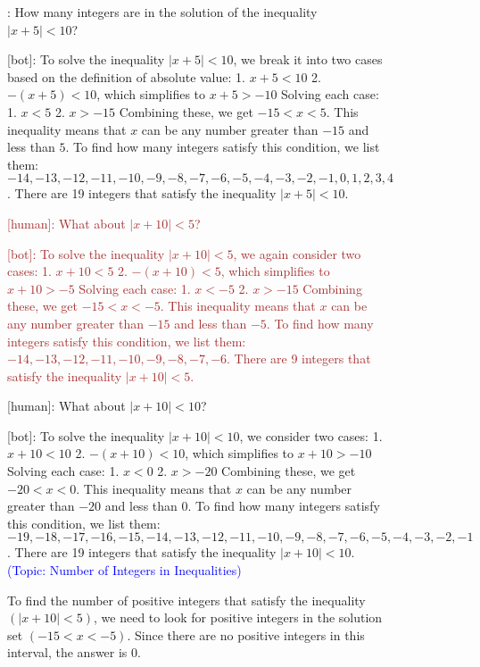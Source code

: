 \begin{figure}[htbp]
\small
\begin{tcolorbox}[left=3pt,right=3pt,top=3pt,bottom=3pt,title=\textbf{Retrieved Memory (Ours):}]
[human]: How many integers are in the solution of the inequality $|x + 5| < 10$?

[bot]: To solve the inequality $|x + 5| < 10$, we break it into two cases based on the definition of absolute value: 
1. $x + 5 < 10$ 
2. $-(x + 5) < 10$, which simplifies to $x + 5 > -10$ 
Solving each case: 
1. $x < 5$ 
2. $x > -15$ 
Combining these, we get $-15 < x < 5$. This inequality means that $x$ can be any number greater than $-15$ and less than $5$. To find how many integers satisfy this condition, we list them: $-14, -13, -12, -11, -10, -9, -8, -7, -6, -5, -4, -3, -2, -1, 0, 1, 2, 3, 4$. There are 19 integers that satisfy the inequality $|x + 5| < 10$.

\textcolor{brown}{
[human]: What about $|x + 10| < 5$?
}

\textcolor{brown}{
[bot]: To solve the inequality $|x + 10| < 5$, we again consider two cases: 
1. $x + 10 < 5$ 
2. $-(x + 10) < 5$, which simplifies to $x + 10 > -5$ 
Solving each case: 
1. $x < -5$ 
2. $x > -15$ 
Combining these, we get $-15 < x < -5$. This inequality means that $x$ can be any number greater than $-15$ and less than $-5$. To find how many integers satisfy this condition, we list them: $-14, -13, -12, -11, -10, -9, -8, -7, -6$. There are 9 integers that satisfy the inequality $|x + 10| < 5$.
}

[human]: What about $|x + 10| < 10$?

[bot]: To solve the inequality $|x + 10| < 10$, we consider two cases: 
1. $x + 10 < 10$ 
2. $-(x + 10) < 10$, which simplifies to $x + 10 > -10$ 
Solving each case: 
1. $x < 0$ 
2. $x > -20$ 
Combining these, we get $-20 < x < 0$. This inequality means that $x$ can be any number greater than $-20$ and less than $0$. To find how many integers satisfy this condition, we list them: $-19, -18, -17, -16, -15, -14, -13, -12, -11, -10, -9, -8, -7, -6, -5, -4, -3, -2, -1$. There are 19 integers that satisfy the inequality $|x + 10| < 10$. \textcolor{blue}{(Topic: Number of Integers in Inequalities)}
\end{tcolorbox}
\begin{tcolorbox}[left=3pt,right=3pt,top=3pt,bottom=3pt,title=\textbf{Answer (Ours):}]
To find the number of positive integers that satisfy the inequality $(|x + 10| < 5)$, we need to look for positive integers in the solution set $(-15 < x < -5)$. Since there are no positive integers in this interval, the answer is 0.


\end{tcolorbox}
\end{figure}
